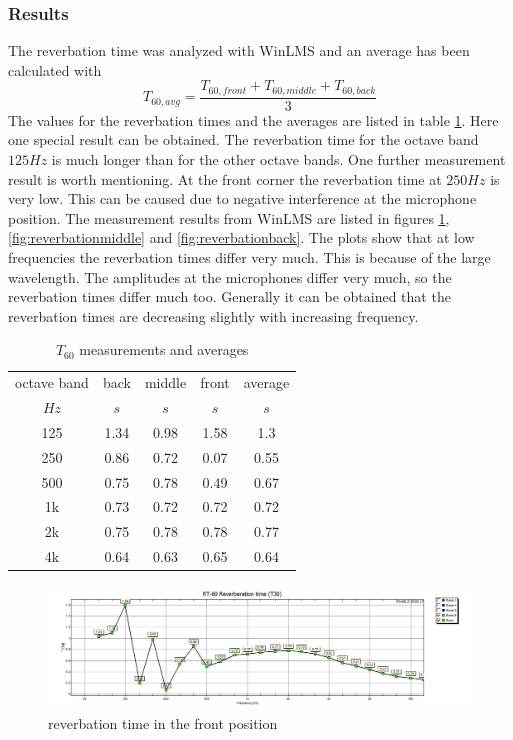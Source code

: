 \documentclass{article}
\begin{document}
\subsubsection{Results}
The reverbation time was analyzed with WinLMS and an average has been calculated with
$$T_{60,avg}=\frac{T_{60,front}+T_{60,middle}+T_{60,back}}{3}$$
The values for the reverbation times and the averages are listed in table \ref{tab:Tmeasurements}. Here one special result can be obtained. The reverbation time for the octave band $125Hz$ is much longer than for the other octave bands. One further measurement result is worth mentioning. At the front corner the reverbation time at $250Hz$ is very low. This can be caused due to negative interference at the microphone position. The measurement results from WinLMS are listed in figures \ref{fig:reverbationfront}, \ref{fig:reverbationmiddle} and \ref{fig:reverbationback}. The plots show that at low frequencies the reverbation times differ very much. This is because of the large wavelength. The amplitudes at the microphones differ very much, so the reverbation times differ much too. Generally it can be obtained that the reverbation times are decreasing slightly with increasing frequency.
\begin{table}
\begin{center}
\begin{tabular}{|c||c|c|c||c|}
\hline
octave band & back & middle & front & average	\\
$Hz$		&	$s$	&	$s$		&	$s$		&	$s$		\\
\hline
\hline
125			& 1.34	&	0.98	&	1.58	&	1.3		\\
\hline
250			& 0.86	&	0.72	&	0.07	&	0.55	\\
\hline
500			& 0.75	& 	0.78	&	0.49	&	0.67	\\
\hline
1k			& 0.73	&	0.72	&	0.72	&	0.72	\\
\hline
2k			& 0.75	&	0.78	&	0.78	&	0.77	\\
\hline
4k			& 0.64	&	0.63	&	0.65	& 	0.64	\\
\hline
\end{tabular}
\caption{$T_{60}$ measurements and averages}
\label{tab:Tmeasurements}
\end{center}
\end{table}
\begin{figure}[htbp]
\begin{center}
\includegraphics[width=15cm,keepaspectratio=true]{reverbationfront}
\caption{reverbation time in the front position}
\label{fig:reverbationfront}
\end{center}
\end{figure}
\end{document}
